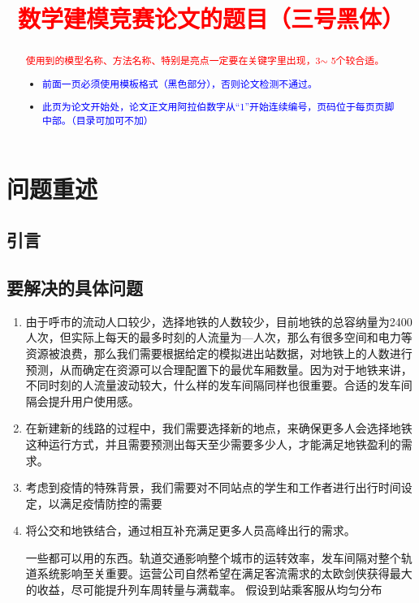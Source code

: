 \documentclass[12pt,a4paper]{mcmthesis}
\title{\textcolor{red}{数学建模竞赛论文的题目（三号黑体）}}
\date{}
\begin{document}
\begin{abstract}


\begin{keywords}
{\song\xiaosihao
\textcolor{red}{使用到的模型名称、方法名称、特别是亮点一定要在关键字里出现，3$\sim$ 5个较合适。}}
\end{keywords}

\begin{itemize}
  \item \textcolor{blue}{前面一页必须使用模板格式（黑色部分），否则论文检测不通过。}
  \item \textcolor{blue}{此页为论文开始处，论文正文用阿拉伯数字从“1”开始连续编号，页码位于每页页脚中部。（目录可加可不加）}
\end{itemize}

\end{abstract}
\maketitle
\renewcommand{\contentsname}{\centerline{\sanhao\bfseries\HEI 目\quad 录}}
\tableofcontents

\newpage
\setcounter{page}{1}
\section{问题重述}
\subsection{引言}


\subsection{要解决的具体问题}
\begin{enumerate}
  \item {由于呼市的流动人口较少，选择地铁的人数较少，目前地铁的总容纳量为2400人次，但实际上每天的最多时刻的人流量为---人次，那么有很多空间和电力等资源被浪费，那么我们需要根据给定的模拟进出站数据，对地铁上的人数进行预测，从而确定在资源可以合理配置下的最优车厢数量。因为对于地铁来讲，不同时刻的人流量波动较大，什么样的发车间隔同样也很重要。合适的发车间隔会提升用户使用感。}
  \item {在新建新的线路的过程中，我们需要选择新的地点，来确保更多人会选择地铁这种运行方式，并且需要预测出每天至少需要多少人，才能满足地铁盈利的需求。}
  \item {考虑到疫情的特殊背景，我们需要对不同站点的学生和工作者进行出行时间设定，以满足疫情防控的需要}
  \item {将公交和地铁结合，通过相互补充满足更多人员高峰出行的需求。}
  
  {一些都可以用的东西。轨道交通影响整个城市的运转效率，发车间隔对整个轨道系统影响至关重要。运营公司自然希望在满足客流需求的太欧剑侠获得最大的收益，尽可能提升列车周转量与满载率。}
  {假设到站乘客服从均匀分布}
\end{enumerate}
\end{document}

